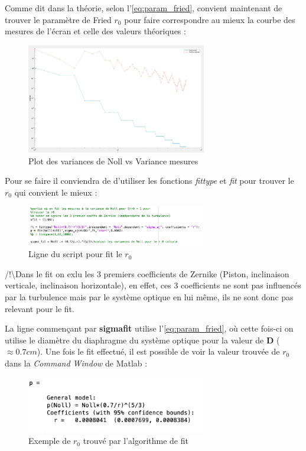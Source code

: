 \newpage
Comme dit dans la théorie, selon l'\autoref{eq:param_fried}, convient maintenant de trouver le paramètre de Fried $r_0$
pour faire correspondre au mieux la courbe des mesures de l'écran et celle des valeurs théoriques :
\begin{figure}[H]
  \centering
  \includegraphics[width = 0.7\textwidth]{assets/figures/mesures/Noll_vs_mesure.png}
  \caption{Plot des variances de Noll vs Variance mesures}
\end{figure}

Pour se faire il conviendra de d'utiliser les fonctions \textit{fittype} et \textit{fit} pour trouver le $r_0$ qui convient le mieux :
\begin{figure}[H]
  \centering
  \includegraphics[width = 0.7\textwidth]{assets/figures/mesures/matlab_fit.png}
  \caption{Ligne du script pour fit le $r_0$}
\end{figure}
\color{red}/!\textbackslash \color{black}Dans le fit on exlu les 3 premiers coefficients de Zernike (Piston, inclinaison verticale, inclinaison horizontale),
en effet, ces 3 coefficients ne sont pas influencés par la turbulence mais par le système optique en lui même, ils ne sont donc pas relevant pour le fit.

La ligne commençant par \textbf{sigma\textunderscore fit} utilise l'\autoref{eq:param_fried}, où cette fois-ci on utilise le diamètre du diaphragme du système optique pour la
valeur de \textbf{D} ($\approx0.7 cm$). Une fois le fit effectué, il est possible de voir la valeur trouvée de $r_0$ dans la \textit{Command Window} de Matlab :
\begin{figure}[H]
  \centering
  \includegraphics[width = 0.7\textwidth]{assets/figures/mesures/fit_r_resultat.png}
  \caption{Exemple de $r_0$ trouvé par l'algorithme de fit}
\end{figure}

